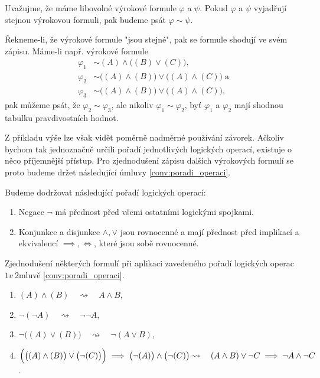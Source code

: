 \begin{convention}
    \label{conv:rovnost_logickych_formuli}
    Uvažujme, že máme libovolné výrokové formule $\varphi$ a $\psi$. Pokud $\varphi$ a $\psi$ vyjadřují stejnou výrokovou formuli, pak budeme psát $\varphi\sim\psi$.
\end{convention}
Řekneme-li, že výrokové formule "jsou stejné", pak se formule shodují ve svém zápisu. Máme-li např. výrokové formule
\begin{align*}
    \varphi_1&\sim (A) \land \bigl((B) \lor (C)\bigr),\\
    \varphi_2&\sim \bigl((A) \land (B)\bigr) \lor \bigl((A) \land (C)\big )\;\text{a}\\
    \varphi_3&\sim \bigl((A) \land (B)\bigr) \lor \bigl((A) \land (C)\bigr),
\end{align*}
pak můžeme psát, že $\varphi_2\sim\varphi_3$, ale nikoliv $\varphi_1\sim\varphi_2$, byť $\varphi_1$ a $\varphi_2$ mají shodnou tabulku pravdivostních hodnot.\par
Z příkladu výše lze však vidět poměrně nadměrné používání závorek. Ačkoliv bychom tak jednoznačně určili pořadí jednotlivých logických operací, existuje o něco příjemnější přístup. Pro zjednodušení zápisu dalších výrokových formulí se proto budeme držet následující úmluvy \ref{conv:poradi_operaci}.
\begin{convention}\label{conv:poradi_operaci}
    Budeme dodržovat následující pořadí logických operací:
    \begin{enumerate}[label=(\arabic*)]
        \item Negace $\neg$ má přednost před všemi ostatními logickými spojkami.
        \item Konjunkce a disjunkce $\land,\lor$ jsou rovnocenné a mají přednost před implikací a ekvivalencí $\implies,\iff$, které jsou sobě rovnocenné.
    \end{enumerate}
\end{convention}
\begin{example}
    Zjednodušení některých formulí při aplikaci zavedeného pořadí logických operac$1 v~$2mluvě \ref{conv:poradi_operaci}.
    \begin{enumerate}[label=(\roman*)]
        \item $(A) \land (B)\quad\rightsquigarrow\quad A \land B$,
        \item $\neg(\neg A)\quad\rightsquigarrow\quad \neg\neg A$,
        \item $\neg \bigl((A) \lor (B)\bigr)\quad \rightsquigarrow\quad \neg(A \lor B)$,
        \item $\Bigl(\bigl((A) \land (B)\bigr) \lor \bigl(\neg (C)\bigr)\Bigr) \implies \bigl(\neg (A)\bigr) \land \bigl(\neg (C)\bigr)\\ \rightsquigarrow\quad(A \land B) \lor \neg C \implies \neg A \land \neg C$.
    \end{enumerate}
\end{example}

